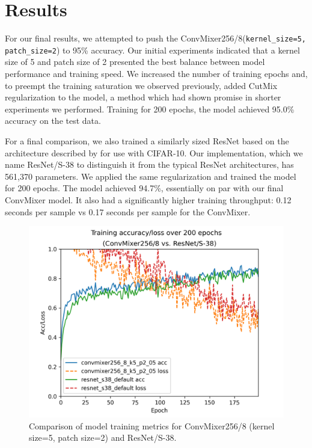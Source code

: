 \documentclass[letterpaper]{article} %
\begin{document}
\section{Results}

For our final results, we attempted to push the ConvMixer256/8(\verb|kernel_size=5, patch_size=2|) to 95\% accuracy. Our initial experiments indicated that a kernel size of 5 and patch size of 2 presented the best balance between model performance and training speed. We increased the number of training epochs and, to preempt the training saturation we observed previously, added CutMix regularization \citep{Yun2019} to the model, a method which had shown promise in shorter experiments we performed. Training for 200 epochs, the model achieved 95.0\% accuracy on the test data.


For a final comparison, we also trained a similarly sized ResNet based on the architecture described by \citet{He2015} for use with CIFAR-10. Our implementation, which we name ResNet/S-38 to distinguish it from the typical ResNet architectures, has 561,370 parameters. We applied the same regularization and trained the model for 200 epochs. The model achieved 94.7\%, essentially on par with our final ConvMixer model. It also had a significantly higher training throughput: 0.12 seconds per sample vs 0.17 seconds per sample for the ConvMixer.

\begin{figure}
    \includegraphics[width=\linewidth]{final_training.png}
    \caption{Comparison of model training metrics for ConvMixer256/8 (kernel size=5, patch size=2) and ResNet/S-38.}
  \end{figure}
\end{document}
